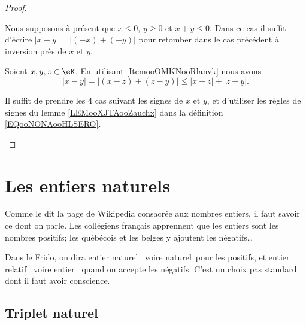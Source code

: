 \begin{proof}
\begin{subproof}
\begin{enumerate}
			      Nous supposons à présent que \( x\leq 0\), \( y\geq 0\) et \( x+y\leq 0\). Dans ce cas il suffit d'écrire \( | x+y |=| (-x)+(-y) |\) pour retomber dans le cas précédent à inversion près de \( x\) et \( y\).
		\end{enumerate}

		Soient \( x,y,z\in \eK\). En utilisant \ref{ItemooOMKNooRlanvk} nous avons
		\begin{equation}
			| x-y |= |  (x-z)+(z-y) |\leq | x-z |+| z-y |.
		\end{equation}

		Il suffit de prendre les 4 cas suivant les signes de \( x\) et \( y\), et d'utiliser les règles de signes du lemme \ref{LEMooXJTAooZauchx} dans la définition \eqref{EQooNONAooHLSERO}.
	\end{subproof}
\end{proof}




\section{Les entiers naturels}
\label{SECooPJSYooNYaIaq}

\begin{normaltext}	\label{NORMooEntierNaturel}
	Comme le dit la page de Wikipedia consacrée aux nombres entiers, il faut savoir ce dont on parle. Les collégiens français apprennent que les entiers sont les nombres positifs; les québécois et les belges y ajoutent les négatifs\dots

	Dans le Frido, on dira \og entier naturel \fg\ voire \og naturel\fg\ pour les positifs, et \og entier relatif \fg\ voire \og entier \fg\ quand on accepte les négatifs. C'est un choix pas standard dont il faut avoir conscience.
\end{normaltext}

\subsection{Triplet naturel}
\label{SUBooTripletNaturel}

